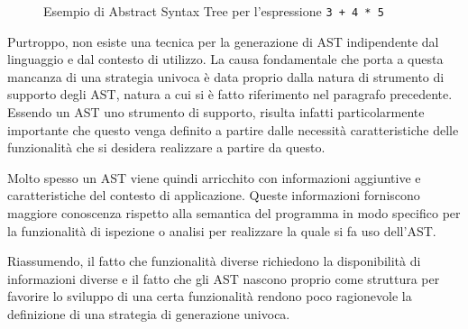 \begin{figure}
\caption{Esempio di Abstract Syntax Tree per l'espressione \texttt{3 + 4 * 5}}
\label{fig:abstract-syntax-tree}
\end{figure}

Purtroppo, non esiste una tecnica per la generazione di AST indipendente dal
linguaggio e dal contesto di utilizzo. La causa fondamentale che porta a questa
mancanza di una strategia univoca è data proprio dalla natura di strumento di
supporto degli AST, natura a cui si è fatto riferimento nel paragrafo
precedente. Essendo un AST uno strumento di supporto, risulta infatti
particolarmente importante che questo venga definito a partire dalle necessità
caratteristiche delle funzionalità che si desidera realizzare a partire da
questo.

Molto spesso un AST viene quindi arricchito con informazioni aggiuntive e
caratteristiche del contesto di applicazione. Queste informazioni forniscono
maggiore conoscenza rispetto alla semantica del programma in modo specifico per
la funzionalità di ispezione o analisi per realizzare la quale si fa uso
dell’AST.

Riassumendo, il fatto che funzionalità diverse richiedono la disponibilità di
informazioni diverse e il fatto che gli AST nascono proprio come struttura per
favorire lo sviluppo di una certa funzionalità rendono poco ragionevole la
definizione di una strategia di generazione univoca.\\

